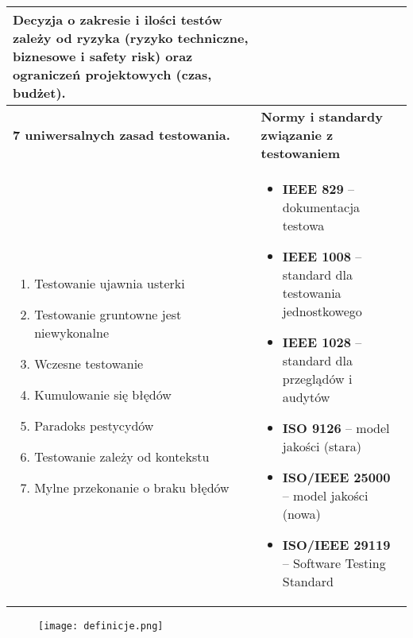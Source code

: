 \documentclass[../main.tex]{subfiles}
\begin{document}
\begin{table}[H]
\begin{center}
\begin{tabular}{| p{8cm}| p{8cm}|}
                Decyzja o zakresie i ilości testów zależy od \textbf{ryzyka} (ryzyko techniczne, biznesowe i safety risk)
                oraz \textbf{ograniczeń projektowych} (czas, budżet).\\
                \hline
                \textbf{7 uniwersalnych zasad testowania.} &  \textbf{Normy i standardy związanie z testowaniem}\\
                \hline
                \begin{enumerate}
                    \item Testowanie ujawnia usterki
                    \item Testowanie gruntowne jest niewykonalne
                    \item Wczesne testowanie
                    \item Kumulowanie się błędów
                    \item Paradoks pestycydów
                    \item Testowanie zależy od kontekstu
                    \item Mylne przekonanie o braku błędów
                \end{enumerate}
                &
                \begin{itemize}
                    \item \textbf{IEEE 829} – dokumentacja testowa
                    \item \textbf{IEEE 1008} – standard dla testowania jednostkowego
                    \item \textbf{IEEE 1028} – standard dla przeglądów i audytów
                    \item \textbf{ISO 9126} – model jakości (stara)
                    \item \textbf{ISO/IEEE 25000} – model jakości (nowa)
                    \item \textbf{ISO/IEEE 29119} – Software Testing Standard
                \end{itemize}\\
                \hline
            \end{tabular}
        \end{center}
    \end{table}

    \begin{figure}[H]
        \texttt{[image: definicje.png]}
    \end{figure}
\end{document}
